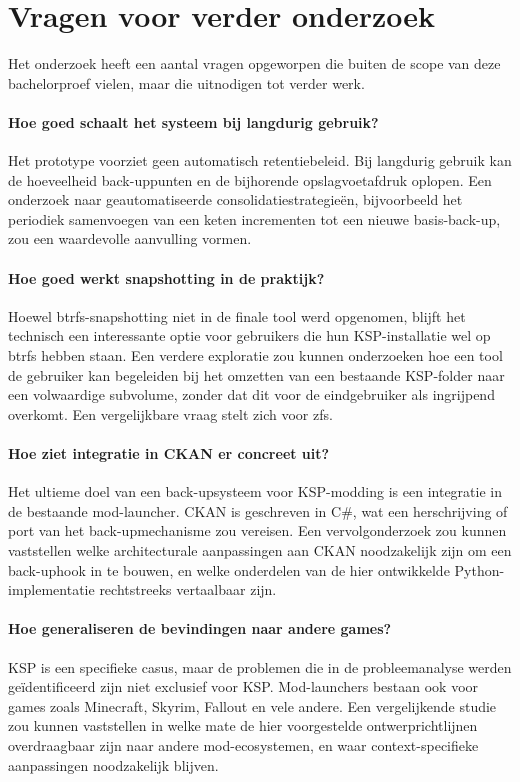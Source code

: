 \section{Vragen voor verder onderzoek}
\label{sec:concl-verder-onderzoek}

Het onderzoek heeft een aantal vragen opgeworpen die buiten de scope van deze bachelorproef vielen, maar die uitnodigen tot verder werk.

\paragraph{Hoe goed schaalt het systeem bij langdurig gebruik?}
Het prototype voorziet geen automatisch retentiebeleid. Bij langdurig gebruik kan de hoeveelheid back-uppunten en de bijhorende opslagvoetafdruk oplopen. Een onderzoek naar geautomatiseerde consolidatiestrategieën, bijvoorbeeld het periodiek samenvoegen van een keten incrementen tot een nieuwe basis-back-up, zou een waardevolle aanvulling vormen.

\paragraph{Hoe goed werkt snapshotting in de praktijk?}
Hoewel btrfs-snapshotting niet in de finale tool werd opgenomen, blijft het technisch een interessante optie voor gebruikers die hun KSP-installatie wel op btrfs hebben staan. Een verdere exploratie zou kunnen onderzoeken hoe een tool de gebruiker kan begeleiden bij het omzetten van een bestaande KSP-folder naar een volwaardige subvolume, zonder dat dit voor de eindgebruiker als ingrijpend overkomt. Een vergelijkbare vraag stelt zich voor zfs.

\paragraph{Hoe ziet integratie in CKAN er concreet uit?}
Het ultieme doel van een back-upsysteem voor KSP-modding is een integratie in de bestaande mod-launcher. CKAN is geschreven in C\#, wat een herschrijving of port van het back-upmechanisme zou vereisen. Een vervolgonderzoek zou kunnen vaststellen welke architecturale aanpassingen aan CKAN noodzakelijk zijn om een back-uphook in te bouwen, en welke onderdelen van de hier ontwikkelde Python-implementatie rechtstreeks vertaalbaar zijn.

\paragraph{Hoe generaliseren de bevindingen naar andere games?}
KSP is een specifieke casus, maar de problemen die in de probleemanalyse werden geïdentificeerd zijn niet exclusief voor KSP. Mod-launchers bestaan ook voor games zoals Minecraft, Skyrim, Fallout en vele andere. Een vergelijkende studie zou kunnen vaststellen in welke mate de hier voorgestelde ontwerprichtlijnen overdraagbaar zijn naar andere mod-ecosystemen, en waar context-specifieke aanpassingen noodzakelijk blijven.

